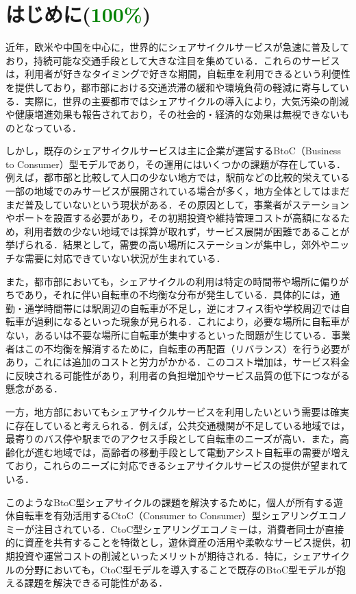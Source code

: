 \section{はじめに(\textcolor{green}{100\%})}
  \label{sec:はじめに}
    \par 近年，欧米や中国を中心に，世界的にシェアサイクルサービスが急速に普及しており，持続可能な交通手段として大きな注目を集めている．これらのサービスは，利用者が好きなタイミングで好きな期間，自転車を利用できるという利便性を提供しており，都市部における交通渋滞の緩和や環境負荷の軽減に寄与している．実際に，世界の主要都市ではシェアサイクルの導入により，大気汚染の削減や健康増進効果も報告されており，その社会的・経済的な効果は無視できないものとなっている．
    \par しかし，既存のシェアサイクルサービスは主に企業が運営するBtoC（Business to Consumer）型モデルであり，その運用にはいくつかの課題が存在している．例えば，都市部と比較して人口の少ない地方では，駅前などの比較的栄えている一部の地域でのみサービスが展開されている場合が多く，地方全体としてはまだまだ普及していないという現状がある．その原因として，事業者がステーションやポートを設置する必要があり，その初期投資や維持管理コストが高額になるため，利用者数の少ない地域では採算が取れず，サービス展開が困難であることが挙げられる．結果として，需要の高い場所にステーションが集中し，郊外やニッチな需要に対応できていない状況が生まれている．
     \par また，都市部においても，シェアサイクルの利用は特定の時間帯や場所に偏りがちであり，それに伴い自転車の不均衡な分布が発生している．具体的には，通勤・通学時間帯には駅周辺の自転車が不足し，逆にオフィス街や学校周辺では自転車が過剰になるといった現象が見られる．これにより，必要な場所に自転車がない，あるいは不要な場所に自転車が集中するといった問題が生じている．事業者はこの不均衡を解消するために，自転車の再配置（リバランス）を行う必要があり，これには追加のコストと労力がかかる．このコスト増加は，サービス料金に反映される可能性があり，利用者の負担増加やサービス品質の低下につながる懸念がある．
      \par 一方，地方部においてもシェアサイクルサービスを利用したいという需要は確実に存在していると考えられる．例えば，公共交通機関が不足している地域では，最寄りのバス停や駅までのアクセス手段として自転車のニーズが高い．また，高齢化が進む地域では，高齢者の移動手段として電動アシスト自転車の需要が増えており，これらのニーズに対応できるシェアサイクルサービスの提供が望まれている．
       \par このようなBtoC型シェアサイクルの課題を解決するために，個人が所有する遊休自転車を有効活用するCtoC（Consumer to Consumer）型シェアリングエコノミーが注目されている．CtoC型シェアリングエコノミーは，消費者同士が直接的に資産を共有することを特徴とし，遊休資産の活用や柔軟なサービス提供，初期投資や運営コストの削減といったメリットが期待される．特に，シェアサイクルの分野においても，CtoC型モデルを導入することで既存のBtoC型モデルが抱える課題を解決できる可能性がある．

